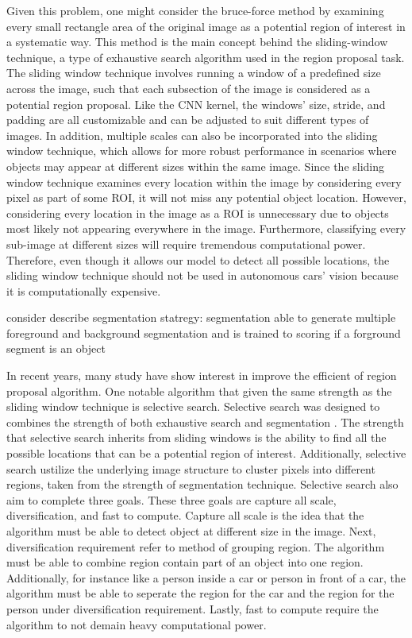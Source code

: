 Given this problem, one might consider the bruce-force method by examining every small rectangle area of the original image as a potential region of interest in a systematic way. This method is the main concept behind the sliding-window technique, a type of exhaustive search algorithm used in the region proposal task. The sliding window technique involves running a window of a predefined size across the image, such that each subsection of the image is considered as a potential region proposal. Like the CNN kernel, the windows' size, stride, and padding are all customizable and can be adjusted to suit different types of images. In addition, multiple scales can also be incorporated into the sliding window technique, which allows for more robust performance in scenarios where objects may appear at different sizes within the same image. Since the sliding window technique examines every location within the image by considering every pixel as part of some ROI, it will not miss any potential object location. However, considering every location in the image as a ROI is unnecessary due to objects most likely not appearing everywhere in the image. Furthermore, classifying every sub-image at different sizes will require tremendous computational power. Therefore, even though it allows our model to detect all possible locations, the sliding window technique should not be used in autonomous cars' vision because it is computationally expensive.

{\color{red} consider describe segmentation statregy: segmentation able to generate multiple foreground and background segmentation and is trained to scoring if a forground segment is an object}

In recent years, many study have show interest in improve the efficient of region proposal algorithm. One notable algorithm that given the same strength as the sliding window technique is selective search. Selective search was designed to combines the strength of both exhaustive search and segmentation \cite{uijlings_selective_search_2013}. The strength that selective search inherits from sliding windows is the ability to find all the possible locations that can be a potential region of interest. Additionally, selective search ustilize the underlying image structure to cluster pixels into different regions, taken from the strength of segmentation technique. Selective search also aim to complete three goals. These three goals are capture all scale, diversiﬁcation, and fast to compute. Capture all scale is the idea that the algorithm must be able to detect object at different size in the image. Next, diversiﬁcation requirement refer to method of grouping region. The algorithm must be able to combine region contain part of an object into one region. Additionally, for instance like a person inside a car or person in front of a car, the algorithm must be able to seperate the region for the car and the region for the person under diversiﬁcation requirement. Lastly, fast to compute require the algorithm to not demain heavy computational power.

